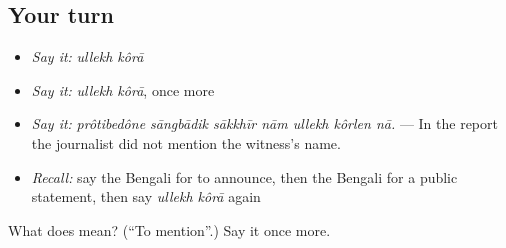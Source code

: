 \subsection*{Your turn}
\begin{itemize}
\raggedright
  \item \emph{Say it:} \emph{ullekh kôrā}
  \item \emph{Say it:} \emph{ullekh kôrā}, once more
  \item \emph{Say it:} \emph{prôtibedône sāngbādik sākkhīr nām ullekh kôrlen nā.} — In the report the journalist did not mention the witness's name.
  \item \emph{Recall:} say the Bengali for to announce, then the Bengali for a public statement, then say \emph{ullekh kôrā} again
\end{itemize}

\begin{tcolorbox}[breakable,colback=teal!4,colframe=teal!35!black,title={Before you move on}]
What does   mean? (\textquotedblleft{}To mention\textquotedblright{}.) Say it once more.
\end{tcolorbox}
